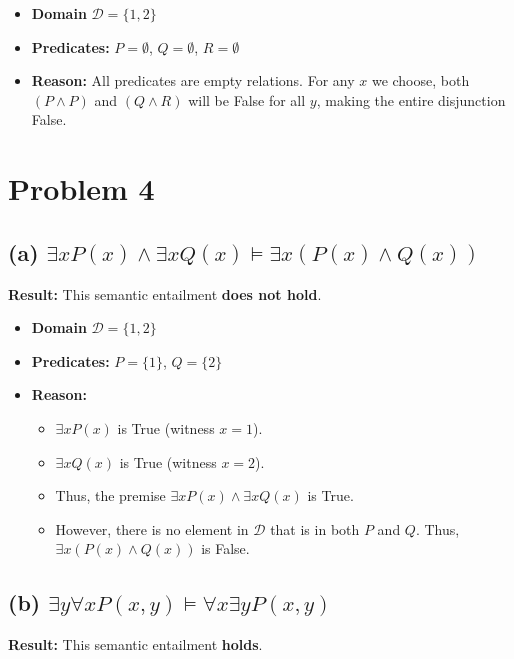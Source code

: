 \documentclass[12pt]{article}
\begin{document}
\begin{tcolorbox}[title=Model $\mathcal{M}_4$ (Does not satisfy)]
    \begin{itemize}
        \item \textbf{Domain} $\mathcal{D} = \{1, 2\}$
        \item \textbf{Predicates:} $P = \emptyset$, $Q = \emptyset$, $R = \emptyset$
        \item \textbf{Reason:} All predicates are empty relations. For any $x$ we choose, both $(P \wedge P)$ and $(Q \wedge R)$ will be False for all $y$, making the entire disjunction False.
    \end{itemize}
\end{tcolorbox}

\newpage
\section*{Problem 4}

\subsection*{(a) $\exists x P(x) \wedge \exists x Q(x) \models \exists x (P(x) \wedge Q(x))$}
\textbf{Result:} This semantic entailment \textbf{does not hold}.

\begin{tcolorbox}[title=Counter-example Model]
    \begin{itemize}
        \item \textbf{Domain} $\mathcal{D} = \{1, 2\}$
        \item \textbf{Predicates:} $P = \{1\}$, $Q = \{2\}$
        \item \textbf{Reason:} 
            \begin{itemize}
                \item $\exists x P(x)$ is True (witness $x=1$).
                \item $\exists x Q(x)$ is True (witness $x=2$).
                \item Thus, the premise $\exists x P(x) \wedge \exists x Q(x)$ is True.
                \item However, there is no element in $\mathcal{D}$ that is in both $P$ and $Q$. Thus, $\exists x (P(x) \wedge Q(x))$ is False.
            \end{itemize}
    \end{itemize}
\end{tcolorbox}

\subsection*{(b) $\exists y \forall x P(x,y) \models \forall x \exists y P(x,y)$}
\textbf{Result:} This semantic entailment \textbf{holds}.
\end{document}
